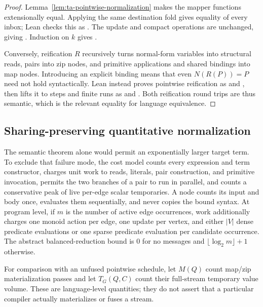 \begin{proof}
Lemma~\ref{lem:ta-pointwise-normalization} makes the mapper functions
extensionally equal.  Applying the same destination fold gives equality of
every inbox; Lean checks this as .  The
update and compact operations are unchanged, giving
.  Induction on $k$ gives
.

Conversely, reification $R$ recursively turns normal-form variables into
structural reads, pairs into zip nodes, and primitive applications and shared
bindings into map nodes.  Introducing an explicit binding means that even
$N(R(P))=P$ need not hold syntactically.  Lean instead proves pointwise
reification as  and
, then lifts it to steps and finite
runs as  and
.  Both reification round trips are thus
semantic, which is the relevant equality for language equivalence.
\end{proof}

\subsection{Sharing-preserving quantitative normalization}

The semantic theorem alone would permit an exponentially larger target term.
To exclude that failure mode, the cost model counts every expression and term
constructor, charges unit work to reads, literals, pair construction, and
primitive invocation, permits the two branches of a pair to run in parallel,
and counts a conservative peak of live per-edge scalar temporaries.  A
 node counts its input and body once, evaluates them sequentially,
and never copies the bound syntax.  At program level, if $m$ is the number of
active edge occurrences, work additionally charges one monoid action per
edge, one update per vertex, and either $|V|$ dense predicate evaluations or
one sparse predicate evaluation per candidate occurrence.  The abstract
balanced-reduction bound is $0$ for no messages and
$\lfloor\log_2 m\rfloor+1$ otherwise.

For comparison with an unfused pointwise schedule, let $M(Q)$ count map/zip
materialization passes and let $T_G(Q,C)$ count their full-stream temporary
value volume.  These are language-level quantities; they do not assert that a
particular compiler actually materializes or fuses a stream.


